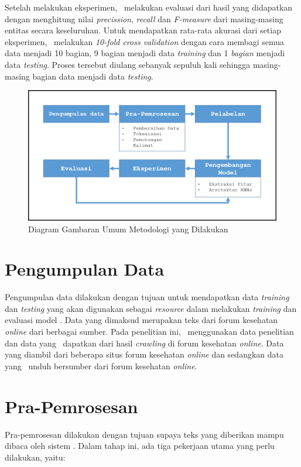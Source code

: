 Setelah melakukan eksperimen, \saya~melakukan evaluasi dari hasil yang didapatkan dengan menghitung nilai \textit{precission}, \textit{recall} dan \textit{F-measure} dari masing-masing entitas secara keseluruhan. Untuk mendapatkan rata-rata akurasi dari setiap eksperimen, \saya~melakukan \textit{10-fold cross validation} dengan cara membagi semua data menjadi 10 bagian, 9 bagian menjadi data \textit{training} dan 1 \textit{bagian} menjadi data \textit{testing}. Proses tersebut diulang sebanyak sepuluh kali sehingga masing-masing bagian data menjadi data \textit{testing}.
\begin{figure}
  \centering
  \includegraphics[width=\linewidth]{images/arsitektur}
  \caption{Diagram Gambaran Umum Metodologi yang Dilakukan}
  \label{fig:metodologi_penelitian}
\end{figure}

\section{Pengumpulan Data}
Pengumpulan data dilakukan dengan tujuan untuk mendapatkan data \textit{training} dan \textit{testing} yang akan digunakan sebagai \textit{resource} dalam melakukan \textit{training} dan evaluasi model \mer. Data yang dimaksud merupakan teks dari forum kesehatan \textit{online} dari berbagai sumber. Pada penelitian ini, \saya~menggunakan data penelitian \cite{skripsiKakRadit} dan data yang \saya~dapatkan dari hasil \textit{crawling} di forum kesehatan \textit{online}. Data yang \cite{skripsiKakRadit} diambil dari beberapa situs forum kesehatan \textit{online} dan sedangkan data yang \saya~unduh bersumber dari forum kesehatan \textit{online}.

\section{Pra-Pemrosesan}
Pra-pemrosesan dilakukan dengan tujuan supaya teks yang diberikan mampu dibaca oleh sistem \mer. Dalam tahap ini, ada tiga pekerjaan utama yang perlu dilakukan, yaitu:

